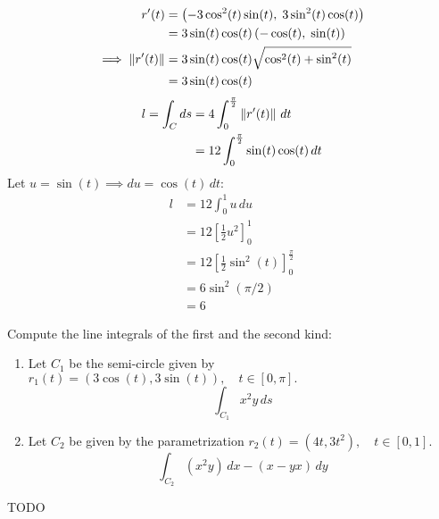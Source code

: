 \begin{solution}
	$$
		\begin{aligned}
			r'(t)                 & = \left( -3 \cos^2(t) \sin(t), \; 3 \sin^2(t) \cos(t) \right) \\
			                      & = 3 \sin(t) \cos(t) \left( -\cos(t), \; \sin(t) \right)       \\
			\implies \left\lVert r'(t) \right\rVert & = 3 \sin(t) \cos(t) \sqrt{\cos^2(t) + \sin^2(t)}              \\
			                      & = 3 \sin(t) \cos(t)
		\end{aligned}
	$$
	$$
		\begin{aligned}
			l = \int_C{ds} & = 4 \int_0^{\frac{\pi}{2}}{\left\lVert r'(t) \right\rVert \, dt}     \\
			               & = 12 \int_0^{\frac{\pi}{2}}{\sin(t) \cos(t) \, dt}
		\end{aligned}
	$$
	Let $u = \sin(t) \implies du = \cos(t) \, dt$:
	$$
		\begin{aligned}
			l & = 12 \int_0^{1}{u \, du}                                      \\
			  & = 12 \left[ \frac{1}{2} u^2 \right]_{0}^{1}                   \\
			  & = 12 \left[ \frac{1}{2} \sin^2(t) \right]_{0}^{\frac{\pi}{2}} \\
			  & = 6 \sin^2(\pi / 2)                                           \\
			  & = 6
		\end{aligned}
	$$
\end{solution}

\begin{exercise}
	Compute the line integrals of the first and the second kind:
	\begin{enumerate}
		\item Let $C_1$ be the semi-circle given by $ r_1(t) = (3 \cos(t), 3 \sin(t)), \quad t \in [0, \pi]. $
		      $$
			      \int_{C_1} x^2 y \, ds
		      $$
		\item Let $C_2$ be given by the parametrization $ r_2(t) = (4t, 3t^2), \quad t \in [0,1]. $
		      $$
			      \int_{C_2} (x^2 y) \, dx - (x - yx) \, dy
		      $$
	\end{enumerate}
\end{exercise}

\begin{solution}
	TODO
\end{solution}
